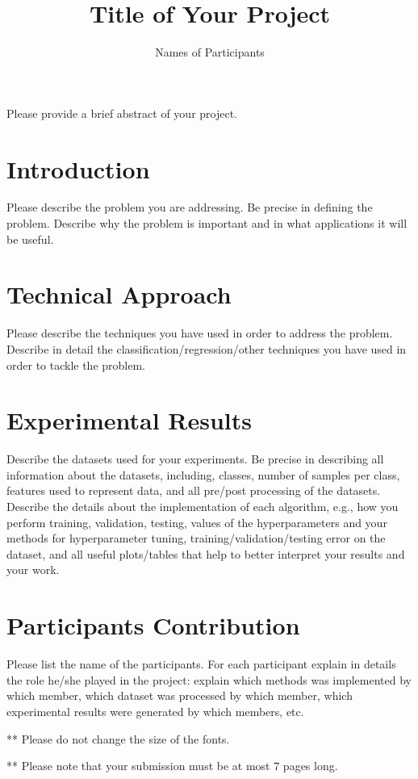 \documentclass[11.5pt]{article}
\title{Title of Your Project}
\author{Names of Participants}
\date{}
\begin{document}
\maketitle

\abstract
Please provide a brief abstract of your project.

\vspace{2mm}
\section{Introduction}
Please describe the problem you are addressing. Be precise in defining the problem. Describe why the problem is important and in what applications it will be useful.

\section{Technical Approach}
Please describe the techniques you have used in order to address the problem. Describe in detail the classification/regression/other techniques you have used in order to tackle the problem.

\section{Experimental Results}
Describe the datasets used for your experiments. Be precise in describing all information about the datasets, including, classes, number of samples per class, features used to represent data, and all pre/post processing of the datasets.\\
Describe the details about the implementation of each algorithm, e.g., how you perform training, validation, testing, values of the hyperparameters and your methods for hyperparameter tuning, training/validation/testing error on the dataset, and all useful plots/tables that help to better interpret your results and your work.

\section{Participants Contribution}
Please list the name of the participants. For each participant explain in details the role he/she played in the project: explain which methods was implemented by which member, which dataset was processed by which member, which experimental results were generated by which members, etc.

\vspace{10mm}
** Please do not change the size of the fonts.

** Please note that your submission must be at most 7 pages long.
\end{document}
